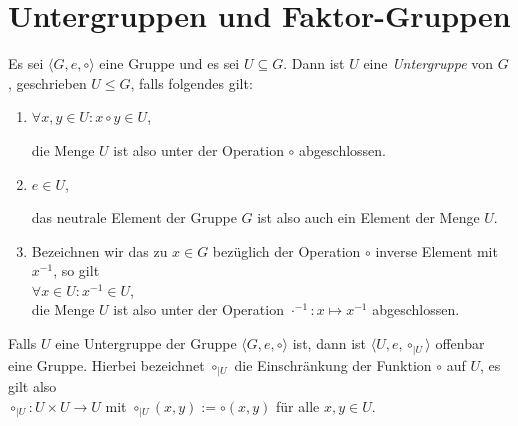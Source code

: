 \section{Untergruppen und Faktor-Gruppen}
\begin{Definition}[Untergruppe]
  Es sei $\langle G, e, \circ \rangle$ eine Gruppe und es sei $U \subseteq G$.  Dann ist $U$ eine 
  \emph{Untergruppe} von $G$, geschrieben $U \leq G$, falls folgendes gilt:
  \begin{enumerate}
  \item $\forall x, y \in U: x \circ y \in U$,

        die Menge $U$ ist also unter der Operation $\circ$ abgeschlossen.
  \item $e \in U$,

        das neutrale Element der Gruppe $G$ ist also auch ein Element der Menge $U$.
  \item Bezeichnen wir das zu $x \in G$ bez\"{u}glich der Operation $\circ$ inverse Element mit $x^{-1}$, 
        so gilt
        \\[0.2cm]
        \hspace*{1.3cm}
        $\forall x \in U: x^{-1} \in U$,
        \\[0.2cm]
        die Menge $U$ ist also unter der Operation $\cdot^{-1}: x \mapsto x^{-1}$ abgeschlossen.
        \eox
  \end{enumerate}
\end{Definition}

\remark
Falls $U$ eine Untergruppe der Gruppe $\langle G, e, \circ \rangle$ ist, dann ist 
$\langle U, e, \circ_{|U} \rangle$
offenbar eine Gruppe.  Hierbei bezeichnet $\circ_{|U}$ die Einschr\"{a}nkung der Funktion $\circ$ auf $U$, es
gilt also
\\[0.2cm]
\hspace*{1.3cm}
$\circ_{|U}: U \times U \rightarrow U$ \quad mit $\circ_{|U}(x,y) := \circ(x,y)$ f\"{u}r alle $x,y \in U$.
\eox

